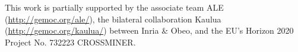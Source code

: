 \documentclass[sigplan, screen, letter]{acmart}
\begin{document}


\maketitle


\begin{acks}
	This work is partially supported by the associate team ALE (\url{http://gemoc.org/ale/}), the bilateral collaboration Kaulua (\url{http://gemoc.org/kaulua/}) between Inria \& Obeo, and the EU's Horizon 2020 Project No. 732223 CROSSMINER.
\end{acks} 

\clearpage
\balance



%
\end{document}
